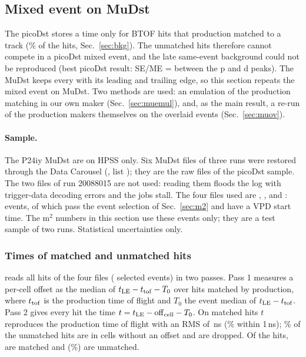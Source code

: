 \subsection{Mixed event on MuDst}
\label{sec:mudst}

The picoDst stores a time only for BTOF hits that production matched to a track (\mtTimedFracVeight\% of the hits,
Sec.~\ref{sec:bkg}). The unmatched hits therefore cannot compete in a picoDst mixed event, and the late same-event
background could not be reproduced (best picoDst result: SE/ME = \mtSbRatioAllVnine{} between the p and d peaks).
The MuDst keeps every  with its leading and trailing edge, so this section repeats the mixed event on
MuDst. Two methods are used: an emulation of the production matching in our own maker (Sec.~\ref{sec:muemul}), and, as the
main result, a re-run of the production makers themselves on the overlaid events (Sec.~\ref{sec:muov}).

\paragraph{Sample.} The P24iy MuDst are on HPSS only. Six MuDst files of three runs were restored through the Data
Carousel (, list ); they are the raw files of the
picoDst sample. The two files of run 20088015 are not used: reading them floods the log with trigger-data decoding errors
and the jobs stall. The four files used are , ,
 and : \ovtEvAll{} events, of which \ovtEvMtwo{} pass the
event selection of Sec.~\ref{sec:m2} and have a VPD start time. The m$^2$ numbers in this section use these events only;
they are a test sample of two runs. Statistical uncertainties only.

\subsubsection{Times of matched and unmatched hits}
\label{sec:muprobe}
 reads all hits of the four files (\prEvents{} selected events) in two passes. Pass 1 measures a
per-cell offset as the median of $t_{\rm LE}-t_{\rm tof}-T_0$ over hits matched by production, where $t_{\rm tof}$ is the
production time of flight and $T_0$ the event median of $t_{\rm LE}-t_{\rm tof}$. Pass 2 gives every hit the time
$t = t_{\rm LE} - {\rm off}_{\rm cell} - T_0$. On matched hits $t$ reproduces the production time of flight with an RMS of
\prCalRMS\,ns (\prCalOneNs\% within 1\,ns); \prNoOffFrac\% of the unmatched hits are in cells without an offset and are
dropped. Of the hits, \prNMatched{} are matched and \prNUnmatched{} (\prUnmatchedFrac\%) are unmatched.

